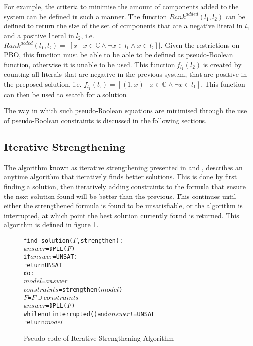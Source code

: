 For example, the criteria to minimise the amount of components added to the system can be defined in such a manner.
The function $Rank^{added}(l_1,l_2)$ can be defined to return the size of the set of components that are a negative literal in $l_1$ and a positive literal in $l_2$,
i.e. $Rank^{added}(l_1,l_2) = |[x \mid x \in \mathbb{C} \wedge \neg x \in l_1 \wedge x \in l_2]|$.
Given the restrictions on PBO, this function must be able to be able to be defined as pseudo-Boolean function, otherwise it is unable to be used.
This function $f_{l_1}(l_2)$ is created by counting all literals that are negative in the previous system, that are positive in the proposed solution,
i.e. $f_{l_1}(l_2) = [(1, x) \mid x \in \mathbb{C} \wedge \neg x \in l_1]$.
This function can then be used to search for a solution.

The way in which such pseudo-Boolean equations are minimised through the use of pseudo-Boolean constraints is discussed in the following sections. 

\subsection{Iterative Strengthening}
The algorithm known as iterative strengthening presented in \cite{calistri1994iterative} and \cite{le2010sat4j}, 
describes an anytime algorithm that iteratively finds better solutions.
This is done by first finding a solution, then iteratively adding constraints to the formula that ensure the next solution found will be better than the previous.
This continues until either the strengthened formula is found to be unsatisfiable, or the algorithm is interrupted, at which point the best solution currently found is returned. 
This algorithm is defined in figure \ref{impl.strength}.

\begin{figure}[htp]
\begin{center}
\begin{alltt}
find-solution(\(F\),strengthen):
    \(answer\) = DPLL(\(F\))
    if \(answer\) = UNSAT:
        return UNSAT
    do:
        \(model\) = \(answer\)
        \(constraints\) = strengthen(\(model\))
        \(F\) = \(F \cup constraints\)
        \(answer\) = DPLL(\(F\))
    while not interrupted() and \(answer\) != UNSAT
    return \(model\) 
\end{alltt}
  \caption{Pseudo code of Iterative Strengthening Algorithm}
  \label{impl.strength}
\end{center}
\end{figure}

